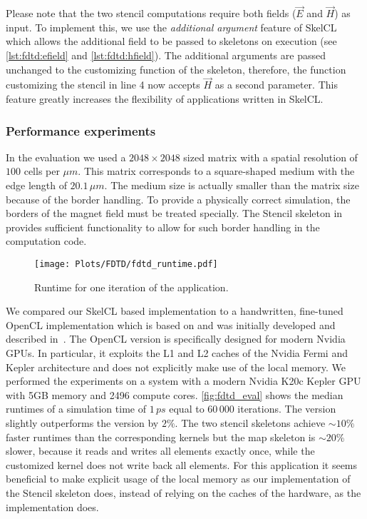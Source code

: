 Please note that the two stencil computations require both fields ($\vec{E}$ and $\vec{H}$) as input.
To implement this, we use the \emph{additional argument} feature of SkelCL which allows the additional field to be passed to skeletons on execution (see \autoref{lst:fdtd:efield} and \autoref{lst:fdtd:hfield}).
The additional arguments are passed unchanged to the customizing function of the skeleton, therefore, the function customizing the stencil in line 4 now accepts $\vec{H}$ as a second parameter.
This feature greatly increases the flexibility of applications written in SkelCL.


\subsubsection*{Performance experiments}

In the evaluation we used a $2048 \times 2048$ sized matrix with a spatial resolution of $100$ cells per $\mu m$.
This matrix corresponds to a square-shaped medium with the edge length of $20.1\,\mu m$.
The medium size is actually smaller than the matrix size because of the border handling.
To provide a physically correct simulation, the borders of the magnet field must be treated specially.
The Stencil skeleton in \SkelCL provides sufficient functionality to allow for such border handling in the computation code.

\begin{figure}[t]
    \centering
    \texttt{[image: Plots/FDTD/fdtd\_runtime.pdf]}
    \caption{Runtime for one iteration of the \FDTD application.}
    \label{fig:fdtd_eval}
\end{figure}

We compared our SkelCL based implementation to a handwritten, fine-tuned OpenCL implementation which is based on \cite{Knitter2013} and was initially developed and described in~\cite{Haidl2011}.
The OpenCL version is specifically designed for modern Nvidia GPUs.
In particular, it exploits the L1 and L2 caches of the Nvidia Fermi and Kepler architecture and does not explicitly make use of the local memory.
We performed the experiments on a system with a modern Nvidia K20c Kepler GPU with 5GB memory and 2496 compute cores.
\autoref{fig:fdtd_eval} shows the median runtimes of a simulation time of $1\,ps$ equal to $60\, 000$ iterations.
The \SkelCL version slightly outperforms the \OpenCL version by $2\%$.
The two stencil skeletons achieve ${\sim}10\%$ faster runtimes than the corresponding \OpenCL kernels but the map skeleton is ${\sim}20\%$ slower, because it reads and writes all elements exactly once, while the customized \OpenCL kernel does not write back all elements.
For this application it seems beneficial to make explicit usage of the local memory as our implementation of the Stencil skeleton does, instead of relying on the caches of the hardware, as the \OpenCL implementation does.

